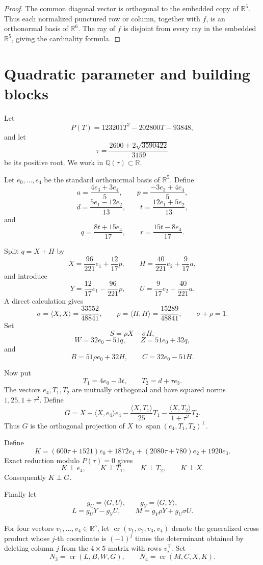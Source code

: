 \documentclass[11pt]{article}
\theoremstyle{definition}
\theoremstyle{plain}
\newcommand{\R}{\mathbb{R}}
\newcommand{\Q}{\mathbb{Q}}
\newcommand{\Span}{\operatorname{span}}
\newcommand{\crs}{\operatorname{cr}}
\begin{document}
\begin{proof}
The common diagonal vector is orthogonal to the embedded copy of \(\R^5\).
Thus each normalized punctured row or column, together with \(f\), is an orthonormal basis of \(\R^6\).
The ray of \(f\) is disjoint from every ray in the embedded \(\R^5\), giving the cardinality formula.
\end{proof}

\section{Quadratic parameter and building blocks}

Let
\[
P(T)=123201T^2-202800T-93848,
\]
and let
\[
\tau=\frac{2600+2\sqrt{3590422}}{3159}
\]
be its positive root.
We work in \(\Q(\tau)\subset\R\).

Let \(e_0,\ldots,e_4\) be the standard orthonormal basis of \(\R^5\).
Define
\[
a=\frac{4e_3+3e_4}{5},\qquad
p=\frac{-3e_3+4e_4}{5},
\]
\[
d=\frac{5e_1-12e_2}{13},\qquad
t=\frac{12e_1+5e_2}{13},
\]
and
\[
q=\frac{8t+15e_4}{17},\qquad
r=\frac{15t-8e_4}{17}.
\]

Split \(q=X+H\) by
\[
X=\frac{96}{221}e_1+\frac{12}{17}p,\qquad
H=\frac{40}{221}e_2+\frac{9}{17}a,
\]
and introduce
\[
Y=\frac{12}{17}e_1-\frac{96}{221}p,\qquad
U=\frac{9}{17}e_2-\frac{40}{221}a.
\]
A direct calculation gives
\[
\sigma=\langle X,X\rangle=\frac{33552}{48841},\qquad
\rho=\langle H,H\rangle=\frac{15289}{48841},\qquad
\sigma+\rho=1.
\]
Set
\[
S=\rho X-\sigma H,
\]
\[
W=32e_0-51q,\qquad Z=51e_0+32q,
\]
and
\[
B=51\rho e_0+32H,\qquad C=32e_0-51H.
\]

Now put
\[
T_1=4e_0-3t,\qquad T_2=d+\tau e_3.
\]
The vectors \(e_4,T_1,T_2\) are mutually orthogonal and have squared norms \(1,25,1+\tau^2\).
Define
\[
G=X-\langle X,e_4\rangle e_4
-\frac{\langle X,T_1\rangle}{25}T_1
-\frac{\langle X,T_2\rangle}{1+\tau^2}T_2.
\]
Thus \(G\) is the orthogonal projection of \(X\) to
\(\Span(e_4,T_1,T_2)^\perp\).

Define
\[
K=(600\tau+1521)e_0+1872e_1+(2080\tau+780)e_2+1920e_3.
\]
Exact reduction modulo \(P(\tau)=0\) gives
\[
K\perp e_4,\qquad K\perp T_1,\qquad K\perp T_2,\qquad K\perp X.
\]
Consequently \(K\perp G\).

Finally let
\[
g_U=\langle G,U\rangle,\qquad g_Y=\langle G,Y\rangle,
\]
\[
L=g_UY-g_YU,\qquad
M=g_Y\rho Y+g_U\sigma U.
\]

For four vectors \(v_1,\ldots,v_4\in\R^5\), let
\(\crs(v_1,v_2,v_3,v_4)\) denote the generalized cross product whose
\(j\)-th coordinate is \((-1)^j\) times the determinant obtained by deleting column \(j\) from the \(4\times5\) matrix with rows \(v_i^{\mathsf T}\).
Set
\[
N_3=\crs(L,B,W,G),\qquad N_4=\crs(M,C,X,K).
\]
\end{document}
